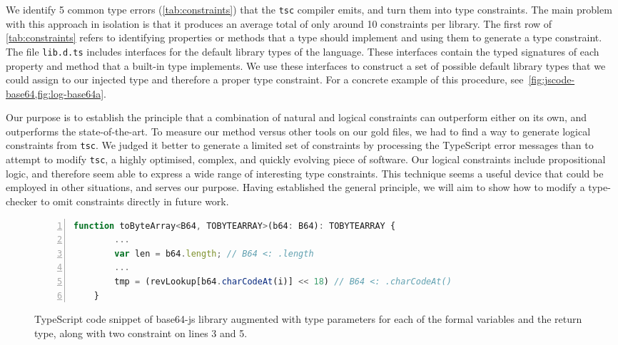 \documentclass[acmsmall, review, anonymous]{acmart}\settopmatter{printfolios=true,printccs=false,printacmref=false}
\begin{document}
We identify 5 common type errors (\cref{tab:constraints}) that the \texttt{tsc}
compiler emits, and turn them into type constraints. The main problem with
this approach in isolation is that it produces an average total
of only around 10 constraints per library. 
The first row of \cref{tab:constraints}
refers to identifying properties or methods that a type should implement
and using them to generate a type constraint.
The file \lstinline{lib.d.ts} includes interfaces for the default library types of the language.
These interfaces contain the typed signatures of each property and method
that a built-in type implements. We use these interfaces to construct a set of
possible default library types that we could assign to our injected type and therefore a proper
type constraint. For a concrete example of this procedure, 
see~\cref{fig:jscode-base64,fig:log-base64a}.


Our purpose is to establish the principle that a combination of natural and logical constraints can outperform either on its own, and outperforms the state-of-the-art.
%
To measure our method versus other tools on our gold files, we had to find a way to generate logical constraints from \lstinline+tsc+.
%
We judged it better to generate a limited set of constraints by processing the
TypeScript error messages than to attempt to modify \lstinline+tsc+, a highly optimised, complex, and quickly evolving piece of software.
%
Our logical constraints include propositional logic, and therefore seem able to express a wide range of interesting type constraints.
%
This technique seems a useful device that could be employed in other situations, and serves our purpose.
%
Having established the general principle, we will aim to show how to modify a type-checker to omit constraints directly in future work.

\begin{figure*}[t]
    \begin{minipage}[c]{\textwidth}
\begin{lstlisting}[language=JavaScript,numbers=left]
    function toByteArray<B64, TOBYTEARRAY>(b64: B64): TOBYTEARRAY {
        ...
        var len = b64.length; // B64 <: .length
        ...
        tmp = (revLookup[b64.charCodeAt(i)] << 18) // B64 <: .charCodeAt()
    }
\end{lstlisting}
    \end{minipage}
    \caption{TypeScript code snippet of base64-js library augmented with type parameters for each of the formal variables and the return type, along with two constraint on lines 3 and 5.}\label{fig:jscode-base64}
\end{figure*}
\end{document}
